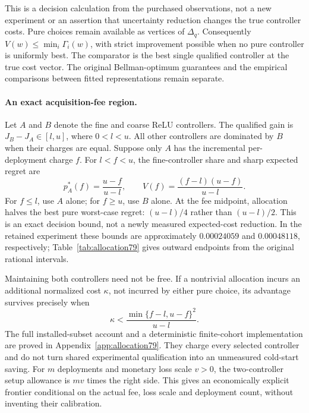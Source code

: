 This is a decision calculation from the purchased observations, not a new experiment or an assertion that uncertainty reduction changes the true controller costs. Pure choices remain available as vertices of $\Delta_q$. Consequently $V(w)\le\min_i\Gamma_i(w)$, with strict improvement possible when no pure controller is uniformly best. The comparator is the best single qualified controller at the true cost vector. The original Bellman-optimum guarantees and the empirical comparisons between fitted representations remain separate.

\paragraph{An exact acquisition-fee region.}
Let $A$ and $B$ denote the fine and coarse ReLU controllers. The qualified gain is $J_B-J_A\in[l,u]$, where $0<l<u$. All other controllers are dominated by $B$ when their charges are equal. Suppose only $A$ has the incremental per-deployment charge $f$. For $l<f<u$, the fine-controller share and sharp expected regret are
\begin{equation}\label{eq:two-allocation79}
 p_A^*(f)=\frac{u-f}{u-l},\qquad
 V(f)=\frac{(f-l)(u-f)}{u-l}.
\end{equation}
For $f\le l$, use $A$ alone; for $f\ge u$, use $B$ alone. At the fee midpoint, allocation halves the best pure worst-case regret: $(u-l)/4$ rather than $(u-l)/2$. This is an exact decision bound, not a newly measured expected-cost reduction. In the retained experiment these bounds are approximately $0.00024059$ and $0.00048118$, respectively; Table~\ref{tab:allocation79} gives outward endpoints from the original rational intervals.

Maintaining both controllers need not be free. If a nontrivial allocation incurs an additional normalized cost $\kappa$, not incurred by either pure choice, its advantage survives precisely when
\begin{equation}\label{eq:setup-threshold79}
 \kappa<\frac{\min\{f-l,u-f\}^{2}}{u-l}.
\end{equation}
The full installed-subset account and a deterministic finite-cohort implementation are proved in Appendix~\ref{app:allocation79}. They charge every selected controller and do not turn shared experimental qualification into an unmeasured cold-start saving. For $m$ deployments and monetary loss scale $v>0$, the two-controller setup allowance is $mv$ times the right side. This gives an economically explicit frontier conditional on the actual fee, loss scale and deployment count, without inventing their calibration.
